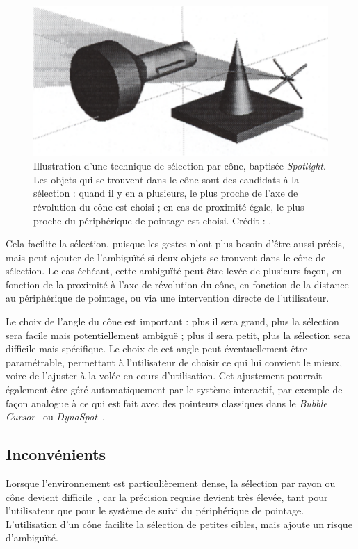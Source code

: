 	\begin{figure}[H]
		\centering
		\includegraphics[width=\textwidth]{figures/ch2/spotlight}
		\caption[Cône de sélection : \emph{Spotlight}]{Illustration d'une technique de sélection par cône, baptisée \emph{Spotlight}. Les objets qui se trouvent dans le cône sont des candidats à la sélection : quand il y en a plusieurs, le plus proche de l'axe de révolution du cône est choisi ; en cas de proximité égale, le plus proche du périphérique de pointage est choisi. Crédit : \cite{liang1994jdcad}.}
		\label{fig:spotlight}
	\end{figure}
	
	Cela facilite la sélection, puisque les gestes n'ont plus besoin d'être aussi précis, mais peut ajouter de l'ambiguïté si deux objets se trouvent dans le cône de sélection. Le cas échéant, cette ambiguïté peut être levée de plusieurs façon, en fonction de la proximité à l'axe de révolution du cône, en fonction de la distance au périphérique de pointage, ou via une intervention directe de l'utilisateur.
	
	Le choix de l'angle du cône est important : plus il sera grand, plus la sélection sera facile mais potentiellement ambiguë ; plus il sera petit, plus la sélection sera difficile mais spécifique. Le choix de cet angle peut éventuellement être paramétrable, permettant à l'utilisateur de choisir ce qui lui convient le mieux, voire de l'ajuster à la volée en cours d'utilisation. Cet ajustement pourrait également être géré automatiquement par le système interactif, par exemple de façon analogue à ce qui est fait avec des pointeurs classiques dans le \emph{Bubble Cursor}~\cite{grossman2005bubble} ou \emph{DynaSpot}~\cite{chapuis2009dynaspot}.
	
	\subsection{Inconvénients}
	Lorsque l'environnement est particulièrement dense, la sélection par rayon ou cône devient difficile~\cite{kopper2011rapid}, car la précision requise devient très élevée, tant pour l'utilisateur que pour le système de suivi du périphérique de pointage. L'utilisation d'un cône facilite la sélection de petites cibles, mais ajoute un risque d'ambiguïté.
	
